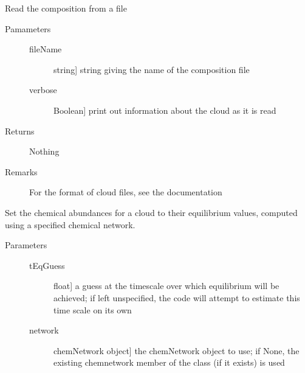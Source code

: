 \documentclass[letterpaper,10pt,english]{sphinxmanual}
\begin{document}
\begin{fulllineitems}
\begin{fulllineitems}
\label{fulldoc:despotic.cloud.read}
Read the composition from a file
\begin{description}
\item[{Pamameters}] \leavevmode\begin{description}
\item[{fileName}] \leavevmode{[}string{]}
string giving the name of the composition file

\item[{verbose}] \leavevmode{[}Boolean{]}
print out information about the cloud as it is read

\end{description}

\item[{Returns}] \leavevmode
Nothing

\item[{Remarks}] \leavevmode
For the format of cloud files, see the documentation

\end{description}

\end{fulllineitems}


\begin{fulllineitems}
\label{fulldoc:despotic.cloud.setChemEq}
Set the chemical abundances for a cloud to their equilibrium
values, computed using a specified chemical network.
\begin{description}
\item[{Parameters}] \leavevmode\begin{description}
\item[{tEqGuess}] \leavevmode{[}float{]}
a guess at the timescale over which equilibrium will be
achieved; if left unspecified, the code will attempt to
estimate this time scale on its own

\item[{network}] \leavevmode{[}chemNetwork object{]}
the chemNetwork object to use; if None, the existing
chemnetwork member of the class (if it exists) is used


\end{description}
\end{description}
\end{fulllineitems}
\end{fulllineitems}
\end{document}
